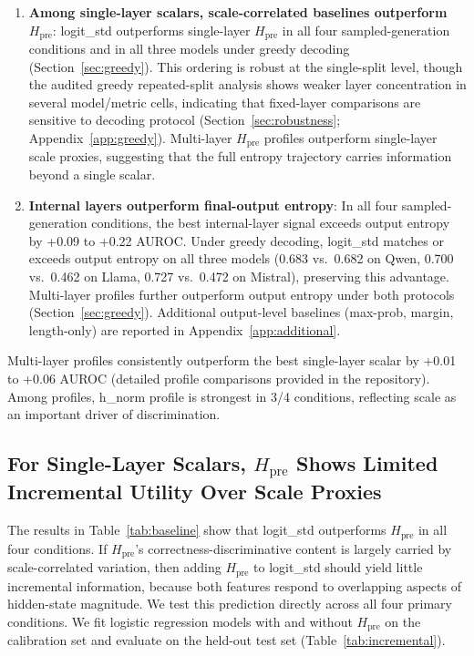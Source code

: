 \documentclass{ieeeaccess}
\newcommand{\Hpre}{H_{\text{pre}}}
\begin{document}
\begin{enumerate}
\item \textbf{Among single-layer scalars, scale-correlated baselines outperform $\Hpre$}: logit\_std outperforms single-layer $\Hpre$ in all four sampled-generation conditions and in all three models under greedy decoding (Section~\ref{sec:greedy}). This ordering is robust at the single-split level, though the audited greedy repeated-split analysis shows weaker layer concentration in several model/metric cells, indicating that fixed-layer comparisons are sensitive to decoding protocol (Section~\ref{sec:robustness}; Appendix~\ref{app:greedy}). Multi-layer $\Hpre$ profiles outperform single-layer scale proxies, suggesting that the full entropy trajectory carries information beyond a single scalar.

\item \textbf{Internal layers outperform final-output entropy}: In all four sampled-generation conditions, the best internal-layer signal exceeds output entropy by +0.09 to +0.22 AUROC. Under greedy decoding, logit\_std matches or exceeds output entropy on all three models (0.683 vs.\ 0.682 on Qwen, 0.700 vs.\ 0.462 on Llama, 0.727 vs.\ 0.472 on Mistral), preserving this advantage. Multi-layer profiles further outperform output entropy under both protocols (Section~\ref{sec:greedy}). Additional output-level baselines (max-prob, margin, length-only) are reported in Appendix~\ref{app:additional}.
\end{enumerate}

Multi-layer profiles consistently outperform the best single-layer scalar by +0.01 to +0.06 AUROC (detailed profile comparisons provided in the repository). Among profiles, h\_norm profile is strongest in 3/4 conditions, reflecting scale as an important driver of discrimination.

\subsection{For Single-Layer Scalars, $\Hpre$ Shows Limited Incremental Utility Over Scale Proxies}
\label{sec:profile_redundancy}

The results in Table~\ref{tab:baseline} show that logit\_std outperforms $\Hpre$ in all four conditions. If $\Hpre$'s correctness-discriminative content is largely carried by scale-correlated variation, then adding $\Hpre$ to logit\_std should yield little incremental information, because both features respond to overlapping aspects of hidden-state magnitude. We test this prediction directly across all four primary conditions. We fit logistic regression models with and without $\Hpre$ on the calibration set and evaluate on the held-out test set (Table~\ref{tab:incremental}).
\end{document}
